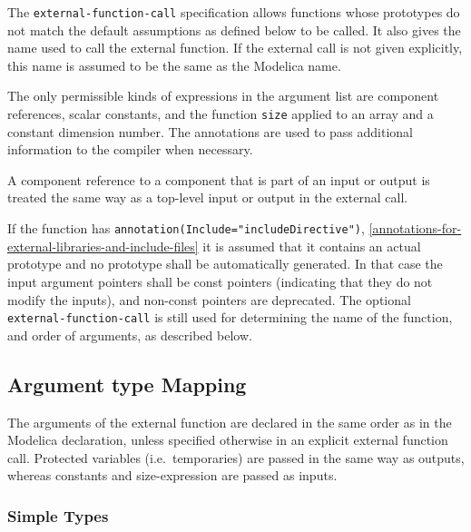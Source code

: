 The \lstinline[language=grammar]!external-function-call! specification allows functions whose prototypes do not match the default assumptions as defined below to be called.  It also gives the name used to call the external function.  If the external call is not given explicitly, this name is assumed to be the same as the Modelica name.

The only permissible kinds of expressions in the argument list are component references, scalar constants, and the function \lstinline!size! applied to an array and a constant dimension number.
The annotations are used to pass additional information to the compiler when necessary.

A component reference to a component that is part of an input or output
is treated the same way as a top-level input or output in the external
call.

If the function has \lstinline!annotation(Include="includeDirective")!, \cref{annotations-for-external-libraries-and-include-files} it is assumed that it contains an actual prototype and no prototype shall be automatically generated.  In that case the input argument pointers shall be const pointers (indicating that they do not modify the inputs), and non-const pointers are deprecated.  The optional \lstinline[language=grammar]!external-function-call! is still used for determining the name of the function, and order of arguments, as described below.

\subsection{Argument type Mapping}\label{argument-type-mapping}

The arguments of the external function are declared in the same order as
in the Modelica declaration, unless specified otherwise in an explicit
external function call. Protected variables (i.e.\ temporaries) are
passed in the same way as outputs, whereas constants and size-expression
are passed as inputs.

\subsubsection{Simple Types}\label{simple-types}

